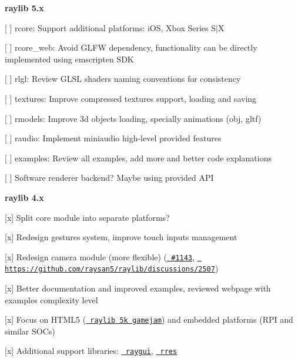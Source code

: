 {\bfseries{raylib 5.\+x}}
\begin{DoxyItemize}
\item \mbox{[} \mbox{]} {\ttfamily rcore}\+: Support additional platforms\+: i\+OS, Xbox Series S\texorpdfstring{$\vert$}{|}X
\item \mbox{[} \mbox{]} {\ttfamily rcore\+\_\+web}\+: Avoid GLFW dependency, functionality can be directly implemented using emscripten SDK
\item \mbox{[} \mbox{]} {\ttfamily rlgl}\+: Review GLSL shaders naming conventions for consistency
\item \mbox{[} \mbox{]} {\ttfamily textures}\+: Improve compressed textures support, loading and saving
\item \mbox{[} \mbox{]} {\ttfamily rmodels}\+: Improve 3d objects loading, specially animations (obj, gltf)
\item \mbox{[} \mbox{]} {\ttfamily raudio}\+: Implement miniaudio high-\/level provided features
\item \mbox{[} \mbox{]} {\ttfamily examples}\+: Review all examples, add more and better code explanations
\item \mbox{[} \mbox{]} Software renderer backend? Maybe using {\ttfamily {}} provided API
\end{DoxyItemize}

{\bfseries{raylib 4.\+x}}
\begin{DoxyItemize}
\item \mbox{[}x\mbox{]} Split core module into separate platforms?
\item \mbox{[}x\mbox{]} Redesign gestures system, improve touch inputs management
\item \mbox{[}x\mbox{]} Redesign camera module (more flexible) (\href{https://github.com/raysan5/raylib/issues/1143}{\texttt{ \#1143}}, \href{https://github.com/raysan5/raylib/discussions/2507}{\texttt{ https\+://github.\+com/raysan5/raylib/discussions/2507}})
\item \mbox{[}x\mbox{]} Better documentation and improved examples, reviewed webpage with examples complexity level
\item \mbox{[}x\mbox{]} Focus on HTML5 (\href{https://itch.io/jam/raylib-5k-gamejam}{\texttt{ raylib 5k gamejam}}) and embedded platforms (RPI and similar SOCs)
\item \mbox{[}x\mbox{]} Additional support libraries\+: \href{https://github.com/raysan5/raygui}{\texttt{ raygui}}, \href{https://github.com/raysan5/rres}{\texttt{ rres}}
\end{DoxyItemize}

